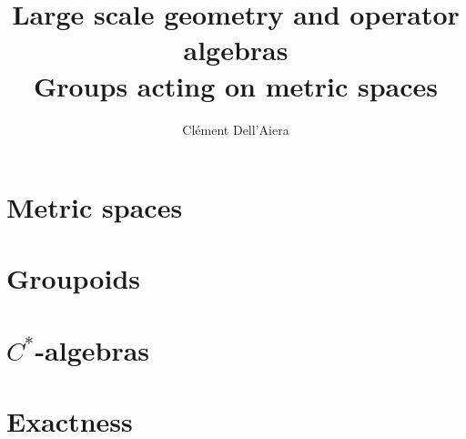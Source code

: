 \documentclass[a4paper,12pt]{book}
\title{\textbf{Large scale geometry and operator algebras}\\
Groups acting on metric spaces}
\date{}
\author{ Clément Dell'Aiera}
\begin{document}
\maketitle

\pagestyle{plain}
\tableofcontents

\pagestyle{fancy}
\chapter{Metric spaces}


\chapter{Groupoids}


\chapter{$C^*$-algebras}


\chapter{Exactness}


%
% 
\end{document}
